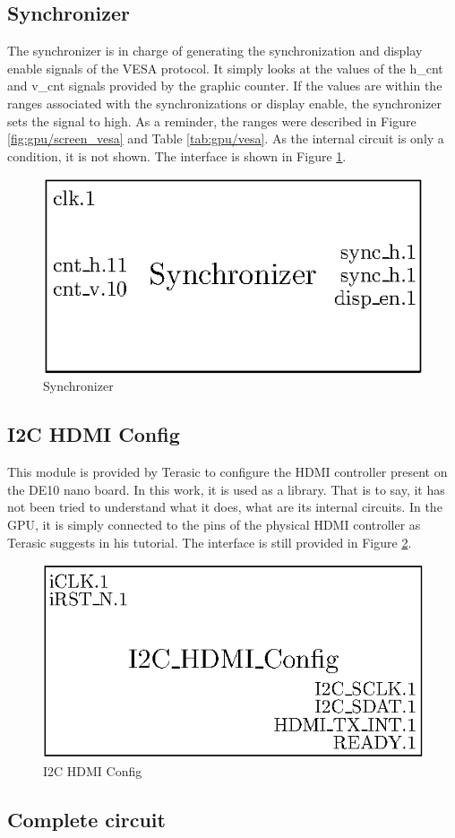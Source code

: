 \subsection{Synchronizer}

The synchronizer is in charge of generating the synchronization and display enable signals of the
VESA protocol. It simply looks at the values of the h\_cnt and v\_cnt signals provided by the 
graphic counter. If the values are within the ranges associated with the synchronizations or display
enable, the synchronizer sets the signal to high. As a reminder, the ranges were described in 
Figure \ref{fig:gpu/screen_vesa} and Table \ref{tab:gpu/vesa}. As the internal circuit is 
only a condition, it is not shown. The interface is shown in Figure \ref{fig:gpu/synchronizer}.  

\begin{figure}[H]
    \centering
    \includegraphics[scale=1.0]{Chapter4-GPU_CLKU/res/synchronizer}
    \caption{Synchronizer}
    \label{fig:gpu/synchronizer}
\end{figure}

\subsection{I2C HDMI Config}

This module is provided by Terasic to configure the HDMI controller present on the DE10 nano board. 
In this work, it is used as a library. That is to say, it has not been tried to understand what it 
does, what are its internal circuits. In the GPU, it is simply connected to the pins of the physical
HDMI controller as Terasic suggests in his tutorial. The interface is still provided in 
Figure \ref{fig:gpu/i2c}.

\begin{figure}[H]
    \centering
    \includegraphics[scale=0.8]{Chapter4-GPU_CLKU/res/i2c}
    \caption{I2C HDMI Config}
    \label{fig:gpu/i2c}
\end{figure}

\subsection{Complete circuit}